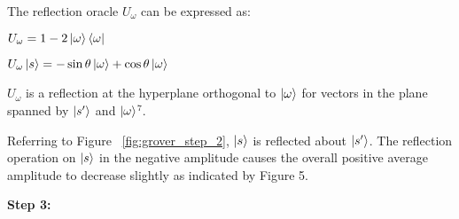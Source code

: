 \documentclass{article}
\begin{document}
\pagebreak

The reflection oracle $U_\omega$ can be expressed as:
\vspace{5mm}

\qquad $U_\omega = 1 - 2\ket{\omega}\bra{\omega}$
\vspace{5mm}

\qquad $U_\omega \ket{s} = -\sin\theta\ket{\omega} +  \cos\theta\ket{\omega} $ 
\vspace{5mm}

\noindent
$U_{{\omega }}$ is a reflection at the hyperplane orthogonal to $\ket{\omega}$  for vectors in the plane spanned by $\ket{s'}$  and $\ket{\omega}$\hyperlink{7}{$^7$}.
\vspace{5mm}

\noindent
Referring to Figure ~\ref{fig:grover_step_2}, $\ket{s}$ is reflected about $\ket{s'}$. The reflection operation on $\ket{s}$ in the negative amplitude causes the overall positive average amplitude to decrease slightly as indicated by Figure 5. 
\vspace{5mm}

\textbf{Step 3:}
\vspace{5mm}
\end{document}
